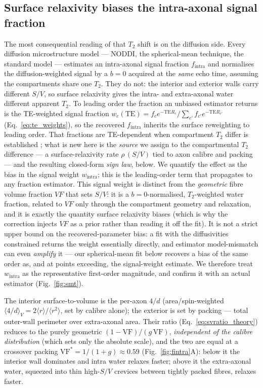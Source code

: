 \subsection{Surface relaxivity biases the intra-axonal signal fraction}
\label{sec:results:fintra}

The most consequential reading of that $T_2$ shift is on the diffusion side. Every diffusion
microstructure model --- NODDI, the spherical-mean technique, the standard model --- estimates
an intra-axonal signal fraction $f_{\mathrm{intra}}$ and normalises the diffusion-weighted
signal by a $b{=}0$ acquired at the \emph{same} echo time, assuming the compartments share one
$T_2$. They do not: the interior and exterior walls carry different $S/V$, so surface relaxivity
gives the intra- and extra-axonal water different apparent $T_2$. To leading order the fraction
an unbiased estimator returns is the TE-weighted signal fraction
$w_c(\mathrm{TE})=f_c e^{-\mathrm{TE}R_c}/\sum_{c'}f_{c'}e^{-\mathrm{TE}R_{c'}}$
(Eq.~\eqref{eq:te_weights}), so the recovered $f_{\mathrm{intra}}$ inherits the surface
reweighting to leading order. That fractions are TE-dependent when compartment $T_2$ differ is
established \citep{Veraart2018}; what is new here is the \emph{source} we assign to the
compartmental $T_2$ difference --- a surface-relaxivity rate $\rho\,(S/V)$ tied to axon calibre
and packing --- and the resulting closed-form \emph{sign law}, below. We quantify the effect as
the bias in the signal weight $w_{\mathrm{intra}}$; this is the leading-order term that
propagates to any fraction estimator. This signal weight is distinct from the \emph{geometric}
fibre volume fraction $VF$ that sets $S/V$: it is a $b{=}0$-normalised, $T_2$-weighted water
fraction, related to $VF$ only through the compartment geometry and relaxation, and it is exactly
the quantity surface relaxivity biases (which is why the correction injects $VF$ as a prior rather
than reading it off the fit). It is not a strict upper bound on the recovered-parameter
bias: a fit with the diffusivities constrained returns the weight essentially directly,
and estimator model-mismatch can even \emph{amplify} it --- our spherical-mean fit below recovers
a bias of the same order as, and at points exceeding, the signal-weight estimate. We therefore
treat $w_{\mathrm{intra}}$ as the representative first-order magnitude, and confirm it with an
actual estimator (Fig.~\ref{fig:smt}).

The interior surface-to-volume is the per-axon $4/d$ (area/spin-weighted
$\langle 4/d\rangle_V=2\langle r\rangle/\langle r^2\rangle$, set by calibre alone); the exterior
is set by packing --- total outer-wall perimeter over extra-axonal area. Their ratio
(Eq.~\eqref{eq:svratio_theory}) reduces to the purely geometric $(1-\mathrm{VF})/(g\,\mathrm{VF})$,
\emph{independent of the calibre distribution} (which sets only the absolute scale), and the two
are equal at a crossover packing $\mathrm{VF}^{\ast}=1/(1+g)\approx0.59$ (Fig.~\ref{fig:fintra}A):
below it the interior wall dominates and intra water relaxes faster; above it the extra-axonal
water, squeezed into thin high-$S/V$ crevices between tightly packed fibres, relaxes faster.

